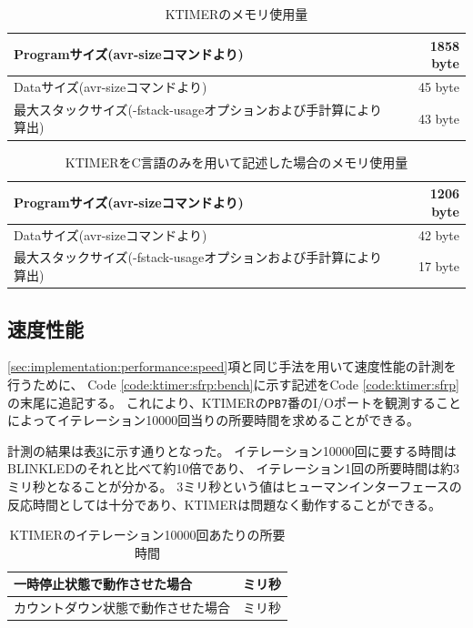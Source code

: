 \begin{table}[h]
  \centering
  \begin{tabular}{l|r}
    Programサイズ(avr-sizeコマンドより) & 1858 byte \\ \hline
    Dataサイズ(avr-sizeコマンドより) & 45 byte \\ \hline
    最大スタックサイズ(-fstack-usageオプションおよび手計算により算出)  & 43 byte \\ \hline
  \end{tabular}
\caption{KTIMERのメモリ使用量}
\label{fig:ktimer:size}
\end{table}

\begin{table}[h]
  \centering
  \begin{tabular}{l|r}
    Programサイズ(avr-sizeコマンドより) & 1206 byte \\ \hline
    Dataサイズ(avr-sizeコマンドより) & 42 byte \\ \hline
    最大スタックサイズ(-fstack-usageオプションおよび手計算により算出)  & 17 byte \\ \hline
  \end{tabular}
\caption{KTIMERをC言語のみを用いて記述した場合のメモリ使用量}
\label{fig:ktimer:naive:size}
\end{table}

\subsection{速度性能}
\ref{sec:implementation:performance:speed}項と同じ手法を用いて速度性能の計測を行うために、
Code \ref{code:ktimer:sfrp:bench}に示す記述をCode \ref{code:ktimer:sfrp}の末尾に追記する。
これにより、KTIMERの\texttt{PB7}番のI/Oポートを観測することによってイテレーション10000回当りの所要時間を求めることができる。

計測の結果は表\ref{fig:ktimer:time}に示す通りとなった。
イテレーション10000回に要する時間はBLINKLEDのそれと比べて約10倍であり、
イテレーション1回の所要時間は約3ミリ秒となることが分かる。
3ミリ秒という値はヒューマンインターフェースの反応時間としては十分であり、KTIMERは問題なく動作することができる。



\begin{table}[h]
  \centering
  \begin{tabular}{l|r}
    一時停止状態で動作させた場合 &  ミリ秒 \\ \hline
    カウントダウン状態で動作させた場合 &  ミリ秒 \\ \hline
  \end{tabular}
\caption{KTIMERのイテレーション10000回あたりの所要時間}
\label{fig:ktimer:time}
\end{table}
